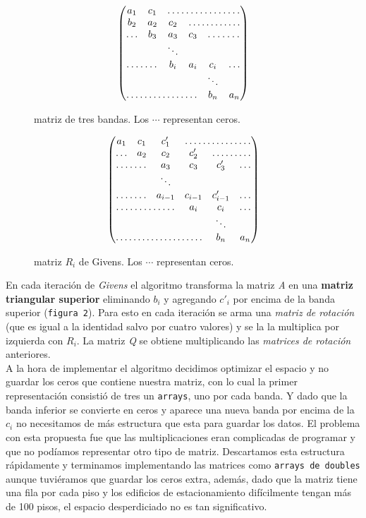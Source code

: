 \documentclass[a4paper]{article}
\begin{document}
\begin{multicols}{2}
\begin{figure}[H]
$$
 \begin{pmatrix}
   a_1 & c_1 & \hdotsfor{4} \\
   b_2 & a_2 &  c_2 & \hdotsfor{3} \\
  \hdots & b_3 & a_3 & c_3 & \hdotsfor{2} \\
   & & \ddots \\
   \hdotsfor{2} & b_i & a_i & c_i & \hdots \\
   & & & & \ddots \\
   \hdotsfor{4} & b_n & a_n \\
 \end{pmatrix}
$$
 \caption{matriz de tres bandas. Los $\cdots$ representan ceros.}
\end{figure}

\begin{figure}[H]
$$
 \begin{pmatrix}
   a_1 & c_1 & c'_1 & \hdotsfor{3} \\
   \hdots & a_2 &  c_2 & c'_2 &\hdotsfor{2} \\
   \hdotsfor{2} & a_3 & c_3 & c'_3 & \hdots \\
   & & \ddots \\
   \hdotsfor{2} & a_{i - 1} & c_{i - 1} & c'_{i - 1} & \hdots \\
   \hdotsfor{3} & a_i & c_i & \hdots \\
   & & & & \ddots \\
   \hdotsfor{4} & b_n & a_n \\
 \end{pmatrix}
$$
 \caption{matriz $R_i$ de Givens. Los $\cdots$ representan ceros.}
\end{figure}
\end{multicols}

En cada iteración de \textit{Givens} el algoritmo transforma la matriz \textit{A} en una \textbf{matriz triangular superior} eliminando $b_i$ y agregando $c'_i$ por encima de la banda superior (\texttt{figura 2}). Para esto en cada iteración se arma una \textit{matriz de rotación} (que es igual a la identidad salvo por cuatro valores) y se la la multiplica por izquierda con $R_i$. La matriz \textit{Q} se obtiene multiplicando las \textit{matrices de rotación} anteriores.\\

A la hora de implementar el algoritmo decidimos optimizar el espacio y no guardar los ceros que contiene nuestra matriz, con lo cual la primer representación consistió de tres un \texttt{arrays}, uno por cada banda. Y dado que la banda inferior se convierte en ceros y aparece una nueva banda por encima de la $c_i$ no necesitamos de más estructura que esta para guardar los datos. El problema con esta propuesta fue que las multiplicaciones eran complicadas de programar y que no podíamos representar otro tipo de matriz. Descartamos esta estructura rápidamente y terminamos implementando las matrices como \texttt{arrays de doubles} aunque tuviéramos que guardar los ceros extra, además, dado que la matriz tiene una fila por cada piso y los edificios de estacionamiento difícilmente tengan más de 100 pisos, el espacio desperdiciado no es tan significativo. 
\end{document}
